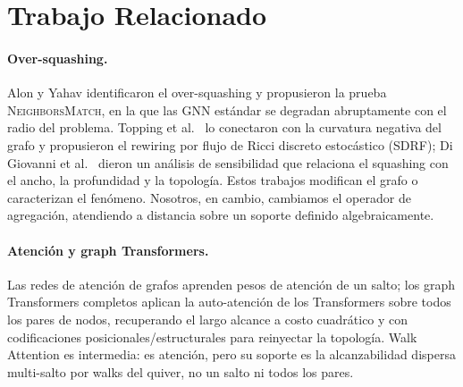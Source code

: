 \documentclass[runningheads]{llncs}
\begin{document}
\section{Trabajo Relacionado}\label{sec:related}

\paragraph{Over-squashing.}
Alon y Yahav \cite{alon2021bottleneck} identificaron el over-squashing y
propusieron la prueba \textsc{NeighborsMatch}, en la que las GNN est\'andar se
degradan abruptamente con el radio del problema. Topping et al.\
\cite{topping2022understanding} lo conectaron con la curvatura
negativa del grafo y propusieron el rewiring por flujo de Ricci discreto
estoc\'astico (SDRF); Di Giovanni et al.\ \cite{digiovanni2023oversquashing} dieron
un an\'alisis de sensibilidad que relaciona el squashing con el ancho, la
profundidad y la topolog\'ia. Estos trabajos modifican el grafo o
caracterizan el fen\'omeno. Nosotros, en cambio, cambiamos el operador de
agregaci\'on, atendiendo a distancia sobre un soporte definido algebraicamente.

\paragraph{Atenci\'on y graph Transformers.}
Las redes de atenci\'on de grafos \cite{velickovic2017graph} aprenden pesos de
atenci\'on de un salto; los graph Transformers completos aplican la auto-atenci\'on
de los Transformers \cite{vaswani2017attention} sobre todos los pares de nodos,
recuperando el largo alcance a costo cuadr\'atico y con codificaciones
posicionales/estructurales para reinyectar la topolog\'ia. Walk Attention es
intermedia: es atenci\'on, pero su soporte es la alcanzabilidad dispersa
multi-salto por walks del quiver, no un salto ni todos los pares.
\end{document}
